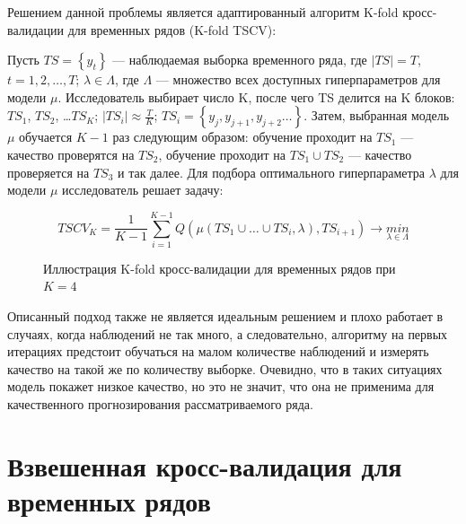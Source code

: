 \documentclass[a4paper, 14pt]{article}
\begin{document}
Решением данной проблемы является адаптированный алгоритм K-fold кросс-валидации для временных рядов (K-fold TSCV):

\noindent Пусть $TS = \left\{y_t\right\}$ --- наблюдаемая выборка временного ряда, где $\left|TS\right| = T$, $t = 1, 2, \dots,  T$; $\lambda \in \Lambda$, где $\Lambda$ --- множество всех доступных гиперпараметров для модели $\mu$. Исследователь выбирает число K, после чего TS делится на K блоков: $TS_1$, $TS_2$, \dots $TS_K$; $\left|TS_i\right| \approx \frac{T}{K}$; 
$TS_i = \left\{y_j, y_{j+1}, y_{j+2}  \dots \right\}$. Затем, выбранная модель $\mu$ обучается $K-1$ раз следующим образом: обучение проходит на $TS_1$ --- качество проверятся на $TS_2$, обучение проходит на $TS_1 \cup TS_2$ --- качество проверяется на $TS_3$ и так далее. Для подбора оптимального гиперпараметра $\lambda$ для модели $\mu$ исследователь решает задачу:

\begin{equation}\label{TSCV}
TSCV_K = \frac{1}{K-1} \sum_{i=1}^{K-1} Q(\mu(TS_1 \cup \dots \cup TS_i, \lambda), TS_{i+1}) \rightarrow \underset{\lambda \in \Lambda}{min}
\end{equation}

\begin{figure}[h]\label{ris: tscv}
	\caption{Иллюстрация K-fold кросс-валидации для временных рядов при $K=4$}
\end{figure}

Описанный подход также не является идеальным решением и плохо работает в случаях, когда наблюдений не так много, а следовательно, алгоритму на первых итерациях предстоит обучаться на малом количестве наблюдений и измерять качество на такой же по количеству выборке. Очевидно, что в таких ситуациях модель покажет низкое качество, но это не значит, что она не применима для качественного прогнозирования рассматриваемого ряда.

\newpage

\section{Взвешенная кросс-валидация для временных рядов}
\end{document}
